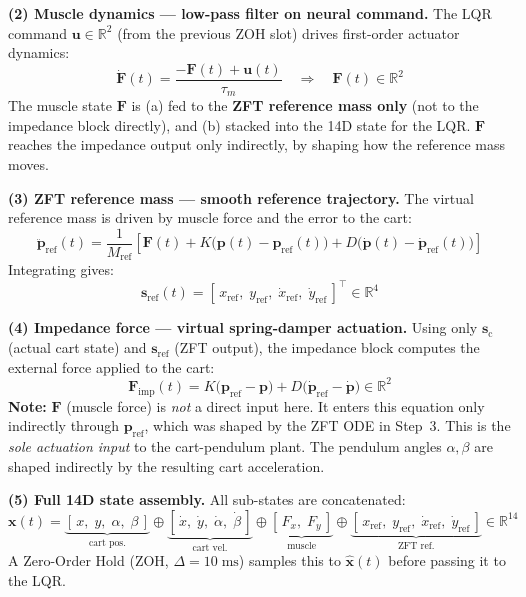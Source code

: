 \documentclass[11pt, a4paper]{article}
\begin{document}
\bigskip
\noindent\textbf{(2) Muscle dynamics — low-pass filter on neural command.}
The LQR command $\bm{u} \in\mathbb{R}^2$ (from the previous ZOH slot) drives
first-order actuator dynamics:
\[
\dot{\bm{F}}(t) = \frac{-\bm{F}(t) + \bm{u}(t)}{\tau_m}
\quad\Longrightarrow\quad
\bm{F}(t) \in\mathbb{R}^2
\]
The muscle state $\bm{F}$ is (a) fed to the \textbf{ZFT reference mass only}
(not to the impedance block directly), and (b) stacked into the 14D state
for the LQR. $\bm{F}$ reaches the impedance output only indirectly, by
shaping how the reference mass moves.

\bigskip
\noindent\textbf{(3) ZFT reference mass — smooth reference trajectory.}
The virtual reference mass is driven by muscle force and the error to the cart:
\[
\ddot{\bm{p}}_{\mathrm{ref}}(t)
= \frac{1}{M_{\mathrm{ref}}}\!\left[
    \bm{F}(t)
    + K\bigl(\bm{p}(t) - \bm{p}_{\mathrm{ref}}(t)\bigr)
    + D\bigl(\dot{\bm{p}}(t) - \dot{\bm{p}}_{\mathrm{ref}}(t)\bigr)
  \right]
\]
Integrating gives:
\[
\bm{s}_{\mathrm{ref}}(t) = [\,x_{\mathrm{ref}},\;y_{\mathrm{ref}},\;\dot{x}_{\mathrm{ref}},\;\dot{y}_{\mathrm{ref}}\,]^{\!\top}
\in\mathbb{R}^4
\]

\bigskip
\noindent\textbf{(4) Impedance force --- virtual spring-damper actuation.}
Using only $\bm{s}_{\mathrm{c}}$ (actual cart state) and
$\bm{s}_{\mathrm{ref}}$ (ZFT output), the impedance block
computes the external force applied to the cart:
\[
\bm{F}_{\mathrm{imp}}(t)
= K\bigl(\bm{p}_{\mathrm{ref}} - \bm{p}\bigr)
+ D\bigl(\dot{\bm{p}}_{\mathrm{ref}} - \dot{\bm{p}}\bigr)
\in\mathbb{R}^2
\]
\textbf{Note:} $\bm{F}$ (muscle force) is \emph{not} a direct input here.
It enters this equation only indirectly through $\bm{p}_{\mathrm{ref}}$,
which was shaped by the ZFT ODE in Step~3.
This is the \emph{sole actuation input} to the cart-pendulum plant.
The pendulum angles $\alpha,\beta$ are shaped indirectly by the resulting
cart acceleration.

\bigskip
\noindent\textbf{(5) Full 14D state assembly.}
All sub-states are concatenated:
\[
\bm{x}(t) =
\underbrace{[\,x,\;y,\;\alpha,\;\beta\,]}_{\text{cart pos.}}
\oplus
\underbrace{[\,\dot{x},\;\dot{y},\;\dot{\alpha},\;\dot{\beta}\,]}_{\text{cart vel.}}
\oplus
\underbrace{[\,F_x,\;F_y\,]}_{\text{muscle}}
\oplus
\underbrace{[\,x_{\mathrm{ref}},\;y_{\mathrm{ref}},\;\dot{x}_{\mathrm{ref}},\;\dot{y}_{\mathrm{ref}}\,]}_{\text{ZFT ref.}}
\in\mathbb{R}^{14}
\]
A Zero-Order Hold (ZOH, $\Delta = 10\;\mathrm{ms}$) samples this to
$\hat{\bm{x}}(t)$ before passing it to the LQR.
\end{document}
